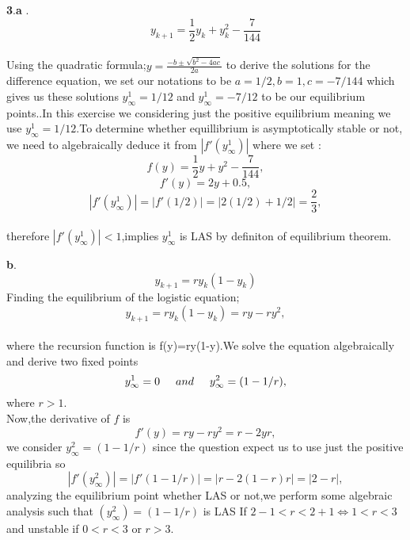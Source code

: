 \documentclass[12pt]{article}
\begin{document}
 
 
 
 
  \cleardoublepage     
 
  \textbf{3}.\textbf{a} .\[y_{k+1}= \frac{1}{2}y_k +y^2_k-\frac{7}{144}\]\\
  Using the quadratic formula;$y=\frac{-b\pm\sqrt{b^2-4ac}}{2a}$ to derive the solutions for the difference equation, we set our notations to be $a=1/2,b=1,c=-7/144$ which gives us these solutions  $y_\infty^1=1/12$ and $y_\infty^1=-7/12$ to be our equilibrium points..In this exercise we considering just the positive equilibrium meaning we use  $y_\infty^1=1/12$.To determine whether equillibrium is asymptotically stable or not, we need to algebraically deduce it from $\left|f'(y_\infty^1)\right|$ where we set :
\[f(y)= \frac{1}{2}y +y^2-\frac{7}{144},\] 
\[f'(y)= 2y+0.5,\] 
 \[\left|f'(y_\infty^1)\right|= \left|f'(1/2)\right|=\left|2(1/2)+1/2\right|=\frac{2}{3},\]\\therefore $\left|f'(y_\infty^1)\right| < 1$,implies $y_\infty^1$ is LAS by definiton of equilibrium theorem.\vspace{1.0cm}

\textbf{b}. \[y_{k+1}=ry_k(1-y_k)\]
Finding the equilibrium of the logistic equation;
\[y_{k+1}=ry_k(1-y_k)=ry-ry^2,\]\\
where the recursion function is f(y)=ry(1-y).We solve the equation algebraically and derive two fixed points
 \[y_\infty^1=0\hspace{0.5cm} and\hspace{0.5cm} y_\infty^2=(1-1/r),\]where $r>1$.\\
 Now,the derivative of $f$ is\\
 \[f'(y)=ry-ry^2=r-2yr,\]we consider $y_\infty^2=(1-1/r)$ since the question expect us to use just the positive equilibria so
\[\left|f'(y_\infty^2)\right|=\left|f'(1-1/r)\right|=\left|r-2(1-r)r\right|=\left|2-r\right|,\]
analyzing the equilibrium point whether LAS or not,we perform some algebraic analysis such that
$(y_\infty^2)=(1-1/r)$ is LAS If $2-1<r<2+1\iff1<r<3$ and unstable if $0<r<3$ or $r>3$.\vspace{1.0cm}

 
  
\end{document}
